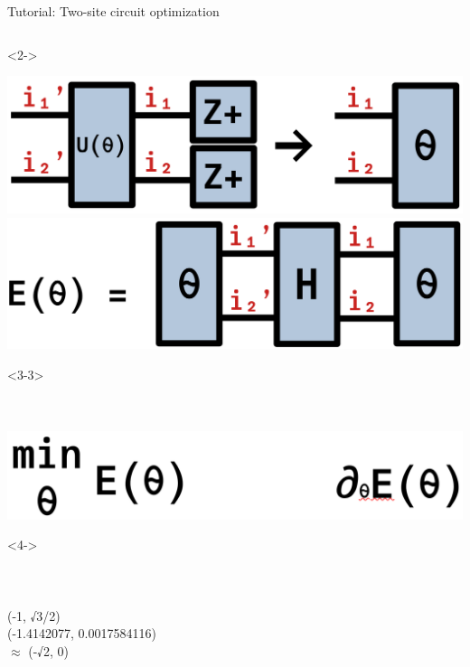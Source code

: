 \begin{frame}[fragile]{Tutorial: Two-site circuit optimization}
\begin{columns}
\begin{column}{5cm}
\begin{onlyenv}<2->
\vspace*{0.0cm}
\begin{center}
\includegraphics[width=1.0\textwidth]{
  slides/assets/UZp1Zp2.png
} \\
\includegraphics[width=1.0\textwidth]{
  slides/assets/theta12Htheta12.png
}
\end{center}
\vspace*{0.0cm}
\end{onlyenv}

\begin{onlyenv}<3-3>
\vspace*{0.0cm}
~\\
~\\
~\\
\begin{center}
\includegraphics[width=1.0\textwidth]{
  slides/assets/min_grad_E_theta.png
}
\end{center}
\vspace*{0.0cm}
\end{onlyenv}

\begin{onlyenv}<4->
~\\
~\\
~\\
~\\
(-1, √3/2) \\
(-1.4142077, 0.0017584116) \\
       $\approx$ (-√2, 0) \\
\end{onlyenv}

\end{column}

\end{columns}

\end{frame}
